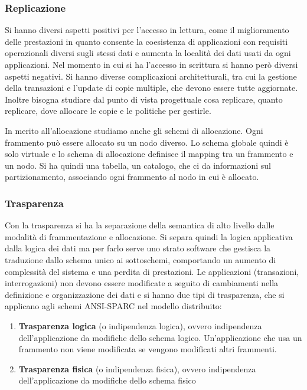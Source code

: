\subsubsection{Replicazione}
Si hanno diversi aspetti positivi per l'accesso in lettura, come il miglioramento
delle prestazioni in quanto consente la coesistenza di applicazioni con requisiti
operazionali diversi sugli stessi dati e aumenta la località dei dati usati da
ogni applicazioni. Nel momento in cui si ha l'accesso in scrittura si hanno però
diversi aspetti negativi. Si hanno diverse complicazioni architetturali, tra cui
la gestione della transazioni e l'update di copie multiple, che devono essere
tutte aggiornate. Inoltre bisogna studiare dal punto di vista progettuale cosa
replicare, quanto replicare, dove allocare le copie e le politiche per gestirle.

In merito all'allocazione studiamo anche gli schemi di allocazione. Ogni
frammento può essere allocato su un nodo diverso. Lo schema globale quindi
è solo virtuale e lo schema di allocazione definisce il mapping tra un frammento
e un nodo. Si ha quindi una tabella, un catalogo, che ci da informazioni sul
partizionamento, associando ogni frammento al nodo in cui è allocato.
\subsubsection{Trasparenza}
Con la trasparenza si ha la separazione della semantica di alto livello dalle
modalità di frammentazione e allocazione. Si separa quindi la logica applicativa
dalla logica dei dati ma per farlo serve uno strato software che gestisca la
traduzione dallo schema unico ai sottoschemi, comportando un aumento di
complessità del sistema e una perdita di prestazioni.
Le applicazioni (transazioni, interrogazioni) non devono essere modificate a
seguito di cambiamenti nella definizione e organizzazione dei dati e si hanno
due tipi di trasparenza, che si applicano agli schemi ANSI-SPARC nel
modello distribuito:
\begin{enumerate}
      \item \textbf{Trasparenza logica} (o indipendenza logica), ovvero
            indipendenza dell'applicazione da modifiche dello schema logico.
            Un'applicazione che usa un frammento non viene modificata se vengono
            modificati altri frammenti.
      \item \textbf{Trasparenza fisica} (o indipendenza fisica), ovvero
            indipendenza dell'applicazione da modifiche dello schema fisico
\end{enumerate}

